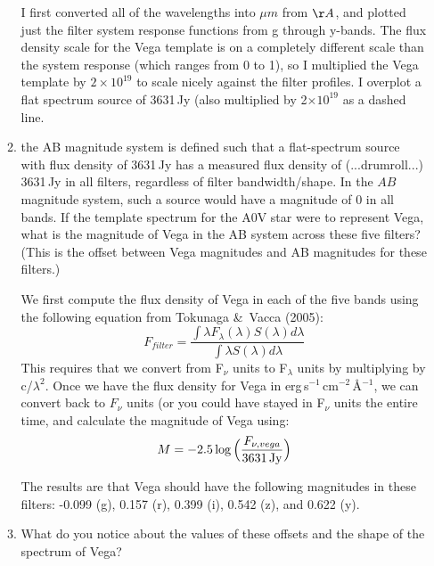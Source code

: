 \documentclass[11pt]{article}
\begin{document}
\begin{enumerate}
\begin{enumerate}
{\color{gray} I first converted all of the wavelengths into $\mu\!m$
  from $\AA$, and plotted just the filter system response functions
  from g through y-bands.  The flux density scale for the Vega
  template is on a completely different scale than the system response
  (which ranges from 0 to 1), so I multiplied the Vega template by
  $2\times10^{19}$ to scale nicely against the filter profiles.  I
  overplot a flat spectrum source of 3631\,Jy (also multiplied by
  2$\times10^{19}$ as a dashed line.}

\begin{figure}[h!]
\centering
\end{figure}

    \item the AB magnitude system is defined such that a flat-spectrum
      source with flux density of 3631\,Jy has a measured flux density
      of (...drumroll...) 3631\,Jy in all filters, regardless of filter
      bandwidth/shape.  In the $AB$ magnitude system, such a source
      would have a magnitude of 0 in all bands.  If the template
      spectrum for the A0V star were to represent Vega, what is the
      magnitude of Vega in the AB system across these five filters?
      (This is the offset between Vega magnitudes and AB magnitudes
      for these filters.)

{\color{gray} We first compute the flux density of Vega in each of the
  five bands using the following equation from Tokunaga \&\ Vacca
  (2005):
\begin{equation}
F_{filter}=\frac{\int\lambda F_\lambda(\lambda)S(\lambda)d\lambda}{\int\lambda S(\lambda)d\lambda}
\end{equation}
This requires that we convert from F$_\nu$ units to F$_\lambda$ units
by multiplying by c/$\lambda^2$.  Once we have the flux density for
Vega in erg\,s$^{-1}$\,cm$^{-2}$\,\AA$^{-1}$, we can convert back to
$F_\nu$ units (or you could have stayed in F$_\nu$ units the entire
time, and calculate the magnitude of Vega using:
\begin{equation}
M = -2.5\log\Big(\frac{F_{\nu,vega}}{3631\,{\rm Jy}}\Big)
\end{equation}

The results are that Vega should have the following magnitudes in these filters: 
-0.099 (g), 0.157 (r), 0.399 (i), 0.542 (z), and 0.622 (y).
 } 

      \item What do you notice about the values of these offsets and
        the shape of the spectrum of Vega?


\end{enumerate}
\end{enumerate}
\end{document}
